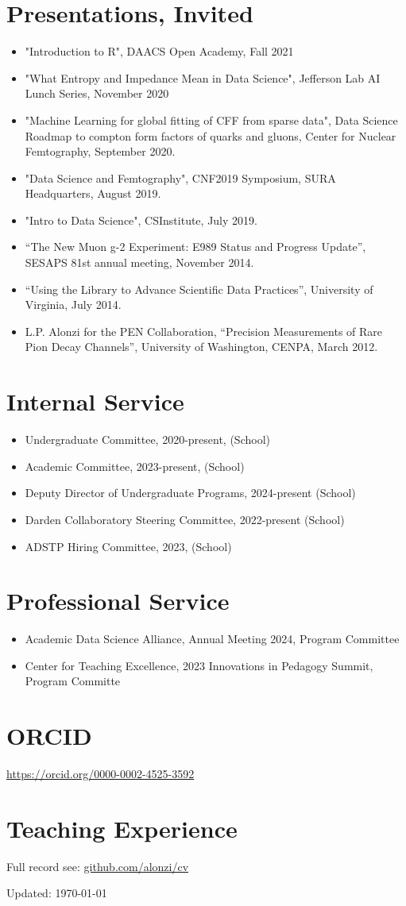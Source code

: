 \documentclass[10pt]{article}
\begin{document}
\section*{Presentations, Invited}
\begin{itemize}
\item "Introduction to R", DAACS Open Academy, Fall 2021
\item "What Entropy and Impedance Mean in Data Science", Jefferson Lab AI Lunch Series, November 2020
\item "Machine Learning for global fitting of CFF from sparse data", Data Science Roadmap to compton form factors of quarks and gluons, Center for Nuclear Femtography, September 2020.
\item "Data Science and Femtography", CNF2019 Symposium, SURA Headquarters, August 2019.
\item "Intro to Data Science", CSInstitute, July 2019.
\item ``The New Muon g-2 Experiment: E989 Status and Progress Update'', SESAPS 81st annual meeting, November 2014.
\item ``Using the Library to Advance Scientific Data Practices'', University of Virginia, July 2014.
\item L.P. Alonzi for the PEN Collaboration, ``Precision Measurements of Rare Pion Decay Channels'', University of Washington, CENPA, March 2012.
\end{itemize}

\section*{Internal Service}
\begin{itemize}
\item Undergraduate Committee, 2020-present, (School)
\item Academic Committee, 2023-present, (School)
\item Deputy Director of Undergraduate Programs, 2024-present (School)
\item Darden Collaboratory Steering Committee, 2022-present (School)
\item ADSTP Hiring Committee, 2023, (School)
\end{itemize}

\section*{Professional Service}
\begin{itemize}
\item Academic Data Science Alliance, Annual Meeting 2024, Program Committee
\item Center for Teaching Excellence, 2023 Innovations in Pedagogy Summit, Program Committe
\end{itemize}

\section*{ORCID}
\href{https://orcid.org/0000-0002-4525-3592}{https://orcid.org/0000-0002-4525-3592}

\section*{Teaching Experience}
Full record see: \href{https://github.com/alonzi/cv/blob/master/teaching-record.md}{github.com/alonzi/cv}

\begin{center} Updated: \today \end{center}
\end{document}
